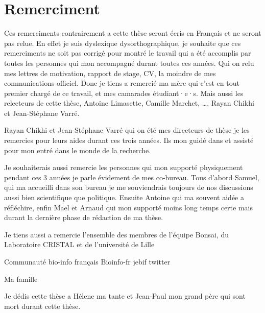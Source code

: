 \documentclass[main.tex]{subfiles}
\begin{document}
\section*{Remerciment}
%

Ces remerciments contrairement a cette thèse seront écris en Français et ne seront pas relue. En effet je suis dyslexique dysorthographique, je souhaite que ces remerciments ne soit pas corrigé pour montré le travail qui a été accomplis par toutes les personnes qui mon accompagné durant toutes ces années. Qui on relu mes lettres de motivation, rapport de stage, CV, la moindre de mes communications officiel. Donc je tiens a remercié ma mère qui c'est en tout premier chargé de ce travail, et mes camarades étudiant·e·s. Mais aussi les relecteurs de cette thèse, Antoine Limasette, Camille Marchet, …, Rayan Chikhi et Jean-Stéphane Varré.

Rayan Chikhi et Jean-Stéphane Varré qui on été mes directeurs de thèse je les remercies pour leurs aides durant ces trois années. Ils mon guidé dans et assisté pour mon entré dans le monde de la recherche.

Je souhaiterais aussi remercie les personnes qui mon supporté physiquement pendant ces 3 années je parle évidement de mes co-bureau. Tous d'abord Samuel, qui ma accueilli dans son bureau je me souviendrais toujours de nos discussions aussi bien scientifique que politique. Ensuite Antoine qui ma souvent aidée a réfléchire, enfin Mael et Arnaud qui mon supporté moins long temps certe mais durant la dernière phase de rédaction de ma thèse.

Je tiens aussi a remercie l'ensemble des membres de l'équipe Bonsai, du Laboratoire CRISTAL et de l'université de Lille 


Communauté bio-info français Bioinfo-fr jebif twitter

Ma famille

Je dédis cette thèse a Hélene ma tante et Jean-Paul mon grand père qui sont mort durant cette thèse.
\end{document}
